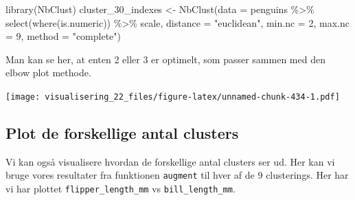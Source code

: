 \documentclass[
]{book}
\newenvironment{Shaded}{\begin{snugshade}}{\end{snugshade}}
\newcommand{\AttributeTok}[1]{\textcolor[rgb]{0.77,0.63,0.00}{#1}}
\newcommand{\DecValTok}[1]{\textcolor[rgb]{0.00,0.00,0.81}{#1}}
\newcommand{\FunctionTok}[1]{\textcolor[rgb]{0.00,0.00,0.00}{#1}}
\newcommand{\NormalTok}[1]{#1}
\newcommand{\OtherTok}[1]{\textcolor[rgb]{0.56,0.35,0.01}{#1}}
\newcommand{\SpecialCharTok}[1]{\textcolor[rgb]{0.00,0.00,0.00}{#1}}
\newcommand{\StringTok}[1]{\textcolor[rgb]{0.31,0.60,0.02}{#1}}
\begin{document}
\begin{Shaded}
\begin{Highlighting}[]
\FunctionTok{library}\NormalTok{(NbClust)}
\NormalTok{cluster\_30\_indexes }\OtherTok{\textless{}{-}} \FunctionTok{NbClust}\NormalTok{(}\AttributeTok{data =}\NormalTok{ penguins }\SpecialCharTok{\%\textgreater{}\%} \FunctionTok{select}\NormalTok{(}\FunctionTok{where}\NormalTok{(is.numeric)) }\SpecialCharTok{\%\textgreater{}\%}\NormalTok{ scale, }
                              \AttributeTok{distance =} \StringTok{"euclidean"}\NormalTok{, }
                              \AttributeTok{min.nc =} \DecValTok{2}\NormalTok{, }
                              \AttributeTok{max.nc =} \DecValTok{9}\NormalTok{, }
                              \AttributeTok{method =} \StringTok{"complete"}\NormalTok{)}
\end{Highlighting}
\end{Shaded}

Man kan se her, at enten 2 eller 3 er optimelt, som passer sammen med den elbow plot methode.

\begin{Shaded}
\end{Shaded}

\texttt{[image: visualisering\_22\_files/figure-latex/unnamed-chunk-434-1.pdf]}

\hypertarget{plot-de-forskellige-antal-clusters}{%
\subsection{Plot de forskellige antal clusters}\label{plot-de-forskellige-antal-clusters}}

Vi kan også visualisere hvordan de forskellige antal clusters ser ud. Her kan vi bruge vores resultater fra funktionen \texttt{augment} til hver af de 9 clusterings. Her har vi har plottet \texttt{flipper\_length\_mm} vs \texttt{bill\_length\_mm}.
\end{document}
